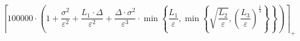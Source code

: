 \[\left\lceil 100000 \cdot \left(1 + \frac{\sigma^{2}}{\varepsilon^{2}} + \frac{L_1 \cdot \Delta}{\varepsilon^{2}} + \frac{\Delta \cdot \sigma^{2}}{\varepsilon^{3}} \cdot \min\left\{ \frac{L_1}{\varepsilon}, \min\left\{ \sqrt{\frac{L_2}{\varepsilon}}, \left(\frac{L_3}{\varepsilon}\right)^{\frac{1}{3}} \right\} \right\}\right) \right\rceil_{+}\]
